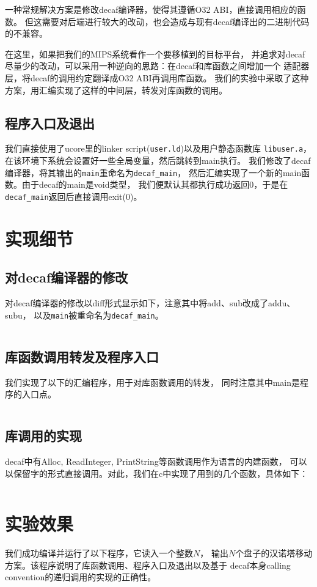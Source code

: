 \documentclass[a4paper]{article}
\begin{document}
一种常规解决方案是修改decaf编译器，使得其遵循O32 ABI，直接调用相应的函数。
但这需要对后端进行较大的改动，也会造成与现有decaf编译出的二进制代码的不兼容。

在这里，如果把我们的MIPS系统看作一个要移植到的目标平台，
并追求对decaf尽量少的改动，可以采用一种逆向的思路：在decaf和库函数之间增加一个
适配器层，将decaf的调用约定翻译成O32 ABI再调用库函数。
我们的实验中采取了这种方案，用汇编实现了这样的中间层，转发对库函数的调用。

\subsection{程序入口及退出}
我们直接使用了ucore里的linker script(\verb|user.ld|)以及用户静态函数库
\verb|libuser.a|，在该环境下系统会设置好一些全局变量，然后跳转到main执行。
我们修改了decaf编译器，将其输出的\verb|main|重命名为\verb|decaf_main|，
然后汇编实现了一个新的main函数。由于decaf的main是void类型，
我们便默认其都执行成功返回0，于是在\verb|decaf_main|返回后直接调用exit(0)。


\section{实现细节}

\subsection{对decaf编译器的修改}
对decaf编译器的修改以diff形式显示如下，注意其中将add、sub改成了addu、subu，
以及\verb|main|被重命名为\verb|decaf_main|。
\inputminted[linenos,fontsize=\small,tabsize=4]{diff}{../decaf.diff}


\subsection{库函数调用转发及程序入口}
我们实现了以下的汇编程序，用于对库函数调用的转发，
同时注意其中main是程序的入口点。
\inputminted[linenos,fontsize=\small,tabsize=4]{nasm}{../entry.s}

\subsection{库调用的实现}
decaf中有Alloc, ReadInteger, PrintString等函数调用作为语言的内建函数，
可以以保留字的形式直接调用。对此，我们在c中实现了用到的几个函数，具体如下：
\inputminted[linenos,fontsize=\small,tabsize=4]{c}{../userlib.c}


\section{实验效果}
我们成功编译并运行了以下程序，它读入一个整数$N$，
输出$N$个盘子的汉诺塔移动方案。该程序说明了库函数调用、程序入口及退出以及基于
decaf本身calling convention的递归调用的实现的正确性。
\inputminted[linenos,fontsize=\small,tabsize=4]{java}{../hanoi.decaf}
\end{document}
